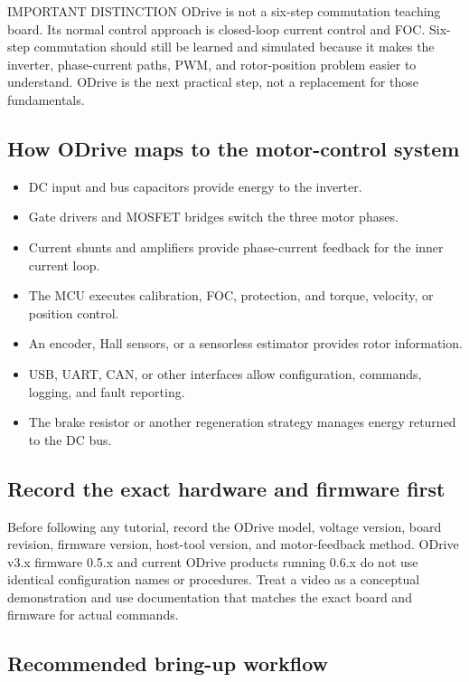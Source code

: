 \documentclass[11pt,a4paper]{article}
\begin{document}
\begin{callout}{IMPORTANT DISTINCTION}
  ODrive is not a six-step commutation teaching board. Its normal control
  approach is closed-loop current control and FOC. Six-step commutation
  should still be learned and simulated because it makes the inverter,
  phase-current paths, PWM, and rotor-position problem easier to understand.
  ODrive is the next practical step, not a replacement for those fundamentals.
\end{callout}

\subsection{How ODrive maps to the motor-control system}

\begin{itemize}
  \item DC input and bus capacitors provide energy to the inverter.
  \item Gate drivers and MOSFET bridges switch the three motor phases.
  \item Current shunts and amplifiers provide phase-current feedback for the inner current loop.
  \item The MCU executes calibration, FOC, protection, and torque, velocity, or position control.
  \item An encoder, Hall sensors, or a sensorless estimator provides rotor information.
  \item USB, UART, CAN, or other interfaces allow configuration, commands, logging, and fault reporting.
  \item The brake resistor or another regeneration strategy manages energy returned to the DC bus.
\end{itemize}

\subsection{Record the exact hardware and firmware first}

Before following any tutorial, record the ODrive model, voltage version, board
revision, firmware version, host-tool version, and motor-feedback method.
ODrive v3.x firmware 0.5.x and current ODrive products running 0.6.x do not
use identical configuration names or procedures. Treat a video as a
conceptual demonstration and use documentation that matches the exact board
and firmware for actual commands.

\subsection{Recommended bring-up workflow}
\end{document}
